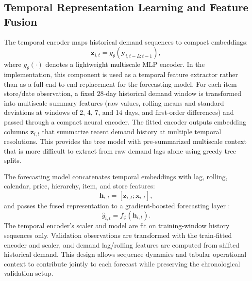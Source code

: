 \documentclass[10pt,conference]{IEEEtran}
\begin{document}
\subsection{Temporal Representation Learning and Feature Fusion}
The temporal encoder maps historical demand sequences to compact embeddings:
\begin{equation}
\mathbf{z}_{i,t} = g_{\theta}(\mathbf{y}_{i,t-L:t-1}),
\end{equation}
where $g_{\theta}(\cdot)$ denotes a lightweight multiscale MLP encoder. In the implementation, this component is used as a temporal feature extractor rather than as a full end-to-end replacement for the forecasting model. For each item-store/date observation, a fixed 28-day historical demand window is transformed into multiscale summary features (raw values, rolling means and standard deviations at windows of 2, 4, 7, and 14 days, and first-order differences) and passed through a compact neural encoder. The fitted encoder outputs embedding columns $\mathbf{z}_{i,t}$ that summarize recent demand history at multiple temporal resolutions. This provides the tree model with pre-summarized multiscale context that is more difficult to extract from raw demand lags alone using greedy tree splits.

The forecasting model concatenates temporal embeddings with lag, rolling, calendar, price, hierarchy, item, and store features:
\begin{equation}
\mathbf{h}_{i,t} = [\mathbf{z}_{i,t}; \mathbf{x}_{i,t}],
\end{equation}
and passes the fused representation to a gradient-boosted forecasting layer \cite{chen2016xgboost}:
\begin{equation}
\hat{y}_{i,t} = f_{\phi}(\mathbf{h}_{i,t}).
\end{equation}
The temporal encoder's scaler and model are fit on training-window history sequences only. Validation observations are transformed with the train-fitted encoder and scaler, and demand lag/rolling features are computed from shifted historical demand. This design allows sequence dynamics and tabular operational context to contribute jointly to each forecast while preserving the chronological validation setup.
\end{document}
